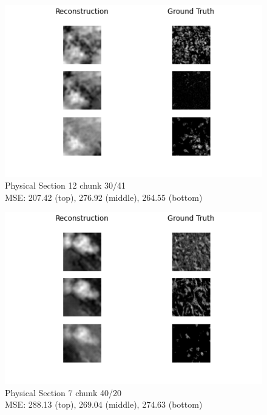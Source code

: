 \documentclass[10pt,twocolumn,letterpaper]{article}
\begin{document}
\begin{figure}[!h]
	\centering
	\captionsetup{justification=centering}
		\hspace*{-1cm}
		\includegraphics[scale=0.65]{../figures/12_30_41.png}
	\caption{Physical Section 12 chunk 30/41\\ MSE: 207.42 (top), 276.92 (middle), 264.55 (bottom)}		
\end{figure}

\vspace*{0.05cm}

\begin{figure}[!h]
	\centering
	\captionsetup{justification=centering}
		\hspace*{-1cm}
		\includegraphics[scale=0.65]{../figures/7_40_20.png}
	\caption{Physical Section 7 chunk 40/20\\ MSE: 288.13 (top), 269.04 (middle), 274.63 (bottom)}		
\end{figure}

\vspace*{0.05cm}
\end{document}
